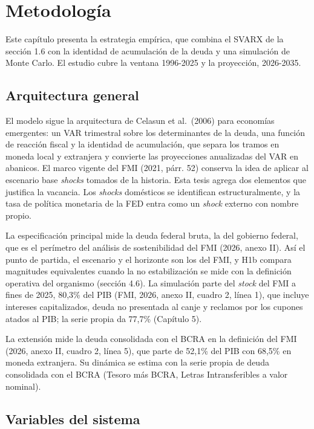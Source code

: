 \chapter{Metodología}

Este capítulo presenta la estrategia empírica, que combina el SVARX de
la sección 1.6 con la identidad de acumulación de la deuda y una
simulación de Monte Carlo. El estudio cubre la ventana 1996-2025 y la
proyección, 2026-2035.

\section{Arquitectura general}

El modelo sigue la arquitectura de Celasun et al.~(2006) para economías
emergentes: un VAR trimestral sobre los determinantes de la deuda, una
función de reacción fiscal y la identidad de acumulación, que separa los
tramos en moneda local y extranjera y convierte las proyecciones
anualizadas del VAR en abanicos. El marco vigente del FMI (2021, párr.
52) conserva la idea de aplicar al escenario base \emph{shocks} tomados
de la historia. Esta tesis agrega dos elementos que justifica la
vacancia. Los \emph{shocks} domésticos se identifican estructuralmente,
y la tasa de política monetaria de la FED entra como un \emph{shock}
externo con nombre propio.

La especificación principal mide la deuda federal bruta, la del gobierno
federal, que es el perímetro del análisis de sostenibilidad del FMI
(2026, anexo II). Así el punto de partida, el escenario y el horizonte
son los del FMI, y H1b compara magnitudes equivalentes cuando la no
estabilización se mide con la definición operativa del organismo
(sección 4.6). La simulación parte del \emph{stock} del FMI a fines de
2025, 80,3\% del PIB (FMI, 2026, anexo II, cuadro 2, línea 1), que
incluye intereses capitalizados, deuda no presentada al canje y reclamos
por los cupones atados al PIB; la serie propia da 77,7\% (Capítulo 5).

La extensión mide la deuda consolidada con el BCRA en la definición del
FMI (2026, anexo II, cuadro 2, línea 5), que parte de 52,1\% del PIB con
68,5\% en moneda extranjera. Su dinámica se estima con la serie propia
de deuda consolidada con el BCRA (Tesoro más BCRA, Letras
Intransferibles a valor nominal).

\section{Variables del sistema}

